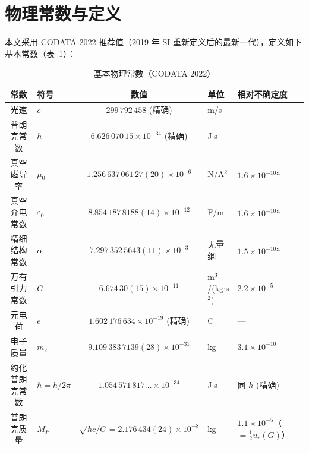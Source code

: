 \documentclass[12pt,a4paper]{article}
\begin{document}
\section{物理常数与定义}

本文采用 CODATA 2022 推荐值\cite{codata2022}（2019 年 SI 重新定义后的最新一代），定义如下基本常数（表~\ref{tab:constants}）：

\begin{table}[h]
\centering
\caption{基本物理常数（CODATA 2022）}
\label{tab:constants}
\footnotesize
\begin{tabular}{@{}clcll@{}}
\toprule
\textbf{常数} & \textbf{符号} & \textbf{数值} & \textbf{单位} & \textbf{相对不确定度} \\
\midrule
光速 & $c$ & $299\,792\,458$ (精确) & m/s & --- \\
普朗克常数 & $h$ & $6.626\,070\,15\times10^{-34}$ (精确) & J$\cdot$s & --- \\
真空磁导率 & $\mu_0$ & $1.256\,637\,061\,27(20)\times10^{-6}$ & N/A$^2$ & $1.6\times10^{-10}$\textsuperscript{a} \\
真空介电常数 & $\varepsilon_0$ & $8.854\,187\,8188(14)\times10^{-12}$ & F/m & $1.6\times10^{-10}$\textsuperscript{a} \\
精细结构常数 & $\alpha$ & $7.297\,352\,5643(11)\times10^{-3}$ & 无量纲 & $1.5\times10^{-10}$\textsuperscript{a} \\
万有引力常数 & $G$ & $6.674\,30(15)\times10^{-11}$ & m$^3$/(kg$\cdot$s$^2$) & $2.2\times10^{-5}$ \\
元电荷 & $e$ & $1.602\,176\,634\times10^{-19}$ (精确) & C & --- \\
电子质量 & $m_e$ & $9.109\,383\,7139(28)\times10^{-31}$ & kg & $3.1\times10^{-10}$ \\
约化普朗克常数 & $\hbar = h/2\pi$ & $1.054\,571\,817\ldots\times10^{-34}$ & J$\cdot$s & 同 $h$ (精确) \\
普朗克质量 & $M_P$ & $\sqrt{\hbar c/G} = 2.176\,434(24)\times10^{-8}$ & kg & $1.1\times10^{-5}$（$=\tfrac12 u_r(G)$） \\
\bottomrule
\end{tabular}
\end{table}
\end{document}
